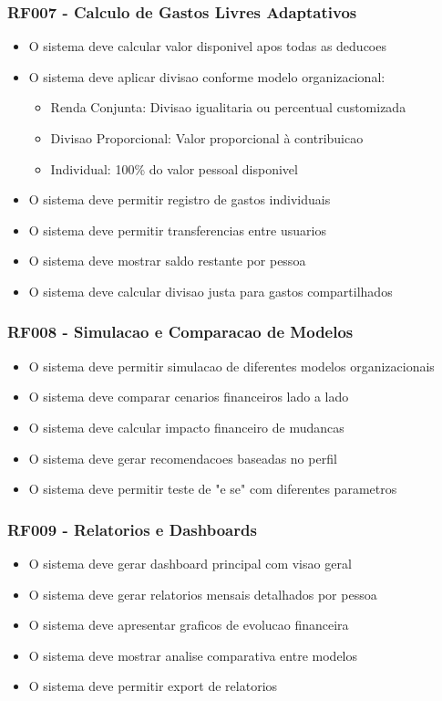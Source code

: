 \subsubsection{RF007 - Calculo de Gastos Livres Adaptativos}
\begin{itemize}
    \item O sistema deve calcular valor disponivel apos todas as deducoes
    \item O sistema deve aplicar divisao conforme modelo organizacional:
    \begin{itemize}
        \item Renda Conjunta: Divisao igualitaria ou percentual customizada
        \item Divisao Proporcional: Valor proporcional à contribuicao
        \item Individual: 100\% do valor pessoal disponivel
    \end{itemize}
    \item O sistema deve permitir registro de gastos individuais
    \item O sistema deve permitir transferencias entre usuarios
    \item O sistema deve mostrar saldo restante por pessoa
    \item O sistema deve calcular divisao justa para gastos compartilhados
\end{itemize}

\subsubsection{RF008 - Simulacao e Comparacao de Modelos}
\begin{itemize}
    \item O sistema deve permitir simulacao de diferentes modelos organizacionais
    \item O sistema deve comparar cenarios financeiros lado a lado
    \item O sistema deve calcular impacto financeiro de mudancas
    \item O sistema deve gerar recomendacoes baseadas no perfil
    \item O sistema deve permitir teste de "e se" com diferentes parametros
\end{itemize}

\subsubsection{RF009 - Relatorios e Dashboards}
\begin{itemize}
    \item O sistema deve gerar dashboard principal com visao geral
    \item O sistema deve gerar relatorios mensais detalhados por pessoa
    \item O sistema deve apresentar graficos de evolucao financeira
    \item O sistema deve mostrar analise comparativa entre modelos
    \item O sistema deve permitir export de relatorios
\end{itemize}

